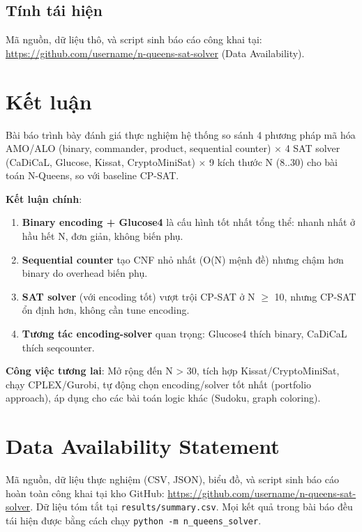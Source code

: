 \documentclass[a4paper,fleqn]{cas-sc}
\begin{document}
\begin{itemize}
{\subsection{Tính tái hiện}
Mã nguồn, dữ liệu thô, và script sinh báo cáo công khai tại: \url{https://github.com/username/n-queens-sat-solver} (Data Availability).

\section{Kết luận}
\label{sec:conclusion}

Bài báo trình bày đánh giá thực nghiệm hệ thống so sánh 4 phương pháp mã hóa AMO/ALO (binary, commander, product, sequential counter) $\times$ 4 SAT solver (CaDiCaL, Glucose, Kissat, CryptoMiniSat) $\times$ 9 kích thước N (8..30) cho bài toán N-Queens, so với baseline CP-SAT.

\textbf{Kết luận chính}:
\begin{enumerate}
    \item \textbf{Binary encoding + Glucose4} là cấu hình tốt nhất tổng thể: nhanh nhất ở hầu hết N, đơn giản, không biến phụ.
    \item \textbf{Sequential counter} tạo CNF nhỏ nhất (O(N) mệnh đề) nhưng chậm hơn binary do overhead biến phụ.
    \item \textbf{SAT solver} (với encoding tốt) vượt trội CP-SAT ở N $\ge$ 10, nhưng CP-SAT ổn định hơn, không cần tune encoding.
    \item \textbf{Tương tác encoding-solver} quan trọng: Glucose4 thích binary, CaDiCaL thích seqcounter.
\end{enumerate}

\textbf{Công việc tương lai}: Mở rộng đến N > 30, tích hợp Kissat/CryptoMiniSat, chạy CPLEX/Gurobi, tự động chọn encoding/solver tốt nhất (portfolio approach), áp dụng cho các bài toán logic khác (Sudoku, graph coloring).

\appendix

\section*{Data Availability Statement}
\label{sec:data}
Mã nguồn, dữ liệu thực nghiệm (CSV, JSON), biểu đồ, và script sinh báo cáo hoàn toàn công khai tại kho GitHub: \url{https://github.com/username/n-queens-sat-solver}. Dữ liệu tóm tắt tại \texttt{results/summary.csv}. Mọi kết quả trong bài báo đều tái hiện được bằng cách chạy \texttt{python -m n\_queens\_solver}.

}
\end{itemize}
\end{document}
